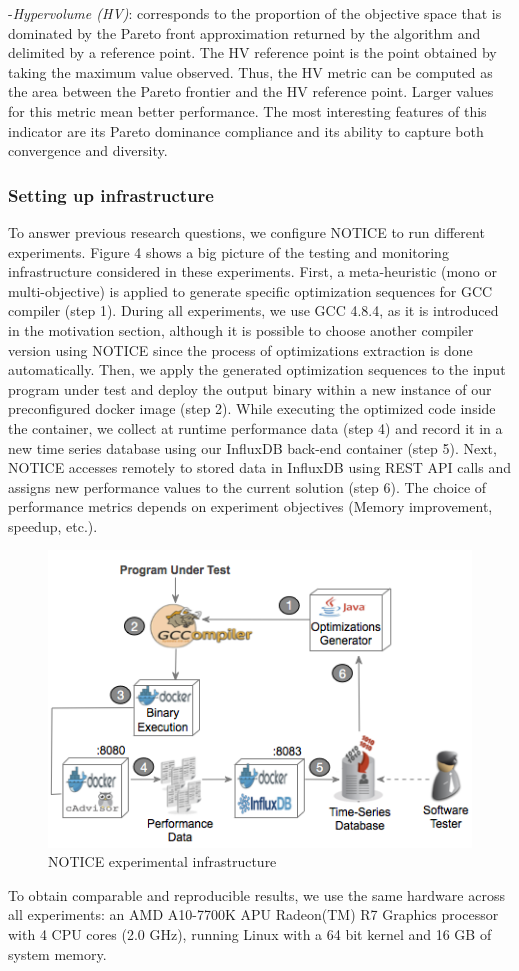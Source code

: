 -\textit{Hypervolume (HV)}: corresponds to the proportion of the objective space that is dominated by the Pareto front approximation returned by the algorithm and delimited by a reference point. The HV reference point is the point obtained by taking the maximum value observed. Thus, the HV metric can be computed as the area between the Pareto frontier and the HV reference point. Larger values for this metric mean better performance. The most interesting features of this indicator are its Pareto dominance compliance and its ability to capture both convergence and diversity\cite{deb2001multi}. 

\subsubsection{Setting up infrastructure}
To answer previous research questions, we configure NOTICE to run different experiments. Figure 4 shows a big picture of the testing and monitoring infrastructure considered in these experiments. 
First, a meta-heuristic (mono or multi-objective) is applied to generate specific optimization sequences for GCC compiler (step 1). During all experiments, we use GCC 4.8.4, as it is introduced in the motivation section, although it is possible to choose another compiler version using NOTICE since the process of optimizations extraction is done automatically. 
Then, we apply the generated optimization sequences to the input program under test and deploy the output binary within a new instance of our preconfigured docker image (step 2). While executing the optimized code inside the container, we collect at runtime performance data (step 4) and record it in a new time series database using our InfluxDB back-end container (step 5). Next, NOTICE accesses remotely to stored data in InfluxDB using REST API calls and assigns new performance values to the current solution (step 6). The choice of performance metrics depends on experiment objectives (Memory improvement, speedup, etc.).
\begin{figure}[h]
	\centering
	\includegraphics[width=0.9\linewidth]{Ressources/infraup.png}
	\caption{NOTICE experimental infrastructure}
\end{figure}

To obtain comparable and reproducible results, we use the same hardware across all experiments: an AMD A10-7700K APU Radeon(TM) R7 Graphics processor with 4 CPU cores (2.0 GHz), running Linux with a 64 bit kernel and 16 GB of system memory.


